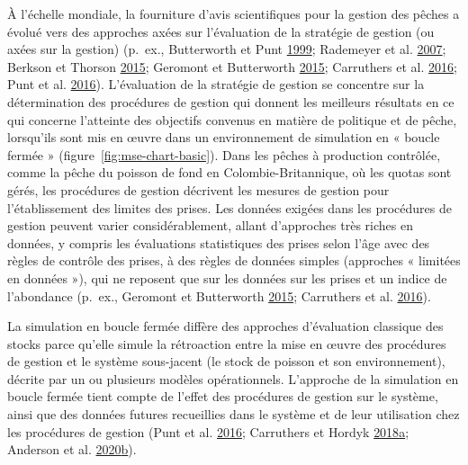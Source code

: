 \documentclass[french,11pt]{book}
\begin{document}
À l'échelle mondiale, la fourniture d'avis scientifiques pour la gestion des pêches a évolué vers des approches axées sur l'évaluation de la stratégie de gestion (ou axées sur la gestion) (p.~ex., Butterworth et Punt \protect\hyperlink{ref-butterworth1999}{1999}; Rademeyer et al. \protect\hyperlink{ref-rademeyer2007}{2007}; Berkson et Thorson \protect\hyperlink{ref-berkson2015}{2015}; Geromont et Butterworth \protect\hyperlink{ref-geromont2015}{2015}; Carruthers et al. \protect\hyperlink{ref-carruthers2016}{2016}; Punt et al. \protect\hyperlink{ref-punt2016}{2016}). L'évaluation de la stratégie de gestion se concentre sur la détermination des procédures de gestion qui donnent les meilleurs résultats en ce qui concerne l'atteinte des objectifs convenus en matière de politique et de pêche, lorsqu'ils sont mis en œuvre dans un environnement de simulation en « boucle fermée » (figure~\ref{fig:mse-chart-basic}). Dans les pêches à production contrôlée, comme la pêche du poisson de fond en Colombie-Britannique, où les quotas sont gérés, les procédures de gestion décrivent les mesures de gestion pour l'établissement des limites des prises. Les données exigées dans les procédures de gestion peuvent varier considérablement, allant d'approches très riches en données, y compris les évaluations statistiques des prises selon l'âge avec des règles de contrôle des prises, à des règles de données simples (approches « limitées en données »), qui ne reposent que sur les données sur les prises et un indice de l'abondance (p.~ex., Geromont et Butterworth \protect\hyperlink{ref-geromont2015}{2015}; Carruthers et al. \protect\hyperlink{ref-carruthers2016}{2016}).

La simulation en boucle fermée diffère des approches d'évaluation classique des stocks parce qu'elle simule la rétroaction entre la mise en œuvre des procédures de gestion et le système sous-jacent (le stock de poisson et son environnement), décrite par un ou plusieurs modèles opérationnels. L'approche de la simulation en boucle fermée tient compte de l'effet des procédures de gestion sur le système, ainsi que des données futures recueillies dans le système et de leur utilisation chez les procédures de gestion (Punt et al. \protect\hyperlink{ref-punt2016}{2016}; Carruthers et Hordyk \protect\hyperlink{ref-carruthers2018}{2018}\protect\hyperlink{ref-carruthers2018}{a}; Anderson et al. \protect\hyperlink{ref-anderson2020gfmp}{2020}\protect\hyperlink{ref-anderson2020gfmp}{b}).
\end{document}
